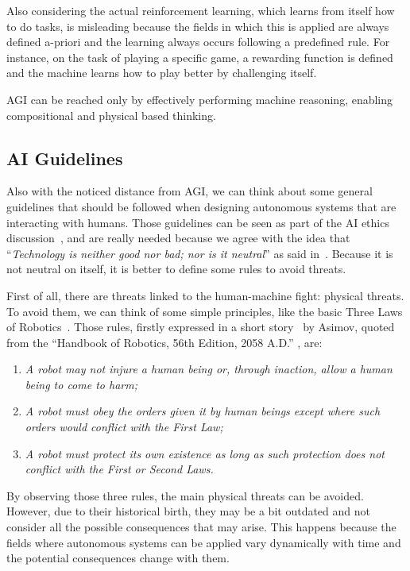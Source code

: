 Also considering the actual reinforcement learning, which learns from itself how to do tasks, is misleading because the fields in which this is applied are always defined a-priori and the learning always occurs following a predefined rule. For instance, on the task of playing a specific game, a rewarding function is defined and the machine learns how to play better by challenging itself.

AGI can be reached only by effectively performing machine reasoning, enabling compositional and physical based thinking.

\subsection{AI Guidelines}
\label{aiGuidelines}

Also with the noticed distance from AGI, we can think about some general guidelines that should be followed when designing autonomous systems that are interacting with humans. Those guidelines can be seen as part of the AI ethics discussion~\cite{hibbard2014ethical,moor2009four}, and are really needed because we agree with the idea that ``\textit{Technology is neither good nor bad; nor is it neutral}''  as said in~\cite{kranzberg1986technology}. Because it is not neutral on itself, it is better to define some rules to avoid threats.

First of all, there are threats linked to the human-machine fight: physical threats. To avoid them, we can think of some simple principles, like the basic Three Laws of Robotics~\cite{clarke2011asimov}. Those rules, firstly expressed in a short story~\cite{asimov1942runaround} by Asimov, quoted from  the ``Handbook of Robotics, 56th Edition, 2058 A.D.'' , are:

\begin{enumerate}
	\item \textit{A robot may not injure a human being or, through inaction, allow a human being to come to harm;}
	\item \textit{A robot must obey the orders given it by human beings except where such orders would conflict with the First Law;}
	\item \textit{A robot must protect its own existence as long as such protection does not conflict with the First or Second Laws.}
\end{enumerate}

By observing those three rules, the main physical threats can be avoided. However, due to their historical birth, they may be a bit outdated and not consider all the possible consequences that may arise. This happens because the fields where autonomous systems can be applied vary dynamically with time and the potential consequences change with them.

